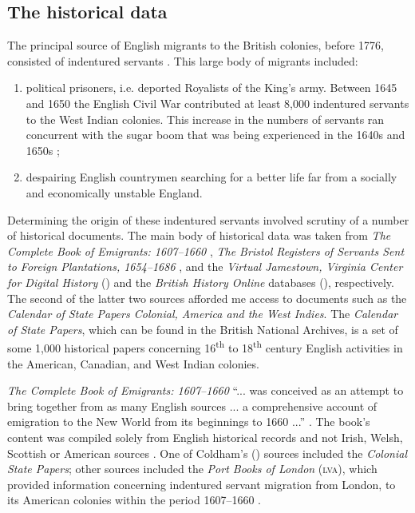 \subsection{The historical data} \label{3.2.3}
The principal source of English migrants to the British colonies, before 1776, consisted of indentured servants \citep{Esposito82}. This large body of migrants included:

\begin{enumerate}
\item{political prisoners, i.e. deported Royalists of the King's army. Between 1645 and 1650 the English Civil War contributed at least 8,000 indentured servants to the West Indian colonies. This increase in the numbers of servants ran concurrent with the sugar boom that was being experienced in the 1640s and 1650s \citep{Brewer96};}
\item{despairing English countrymen searching for a better life far from a socially and economically unstable England.}
\end{enumerate}

Determining the origin of these indentured servants involved scrutiny of a number of historical documents. The main body of historical data was taken from \emph{The Complete Book of Emigrants: 1607--1660} \citep{Coldham92, Coldham87}, \emph{The Bristol Registers of Servants Sent to Foreign Plantations, 1654--1686} \citep{Coldham88}, and the \emph{Virtual Jamestown, Virginia Center for Digital History} (\citeauthor{vcdh}) and the \emph{British History Online} databases (\citeauthor{bho09}), respectively. The second of the latter two sources afforded me access to documents such as the \emph{Calendar of State Papers Colonial, America and the West Indies}. The \emph{Calendar of State Papers}, which can be found in the British National Archives, is a set of some 1,000 historical papers concerning 16\textsuperscript{th} to 18\textsuperscript{th} century English activities in the American, Canadian, and West Indian colonies.

\emph{The Complete Book of Emigrants: 1607--1660} ``... was conceived as an attempt to bring together from as many English sources ... a comprehensive account of emigration to the New World from its beginnings to 1660 ...'' \citep[vii]{Coldham87}. The book's content was compiled solely from English historical records and not Irish, Welsh, Scottish or American sources \citep{Coldham92, Coldham87}. One of  Coldham's (\citeyear{Coldham92, Coldham87}) sources included the \emph{Colonial State Papers}; other sources included the \emph{Port Books of London} (\textsc{lva}), which provided information concerning indentured servant migration from London, to its American colonies within the period 1607--1660 \citep{Coldham92, Coldham87}.

